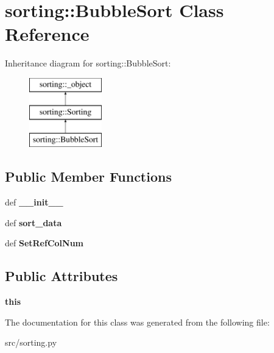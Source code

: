 \hypertarget{classsorting_1_1BubbleSort}{
\section{sorting::BubbleSort Class Reference}
\label{d2/df3/classsorting_1_1BubbleSort}
}
Inheritance diagram for sorting::BubbleSort:\begin{figure}[H]
\begin{center}
\leavevmode
\includegraphics[height=3cm]{d2/df3/classsorting_1_1BubbleSort}
\end{center}
\end{figure}
\subsection*{Public Member Functions}
\begin{DoxyCompactItemize}
\item 
\hypertarget{classsorting_1_1BubbleSort_a085714342ebc22e2621a9c2764b4fffc}{
def {\bfseries \_\-\_\-init\_\-\_\-}}
\label{d2/df3/classsorting_1_1BubbleSort_a085714342ebc22e2621a9c2764b4fffc}

\item 
\hypertarget{classsorting_1_1BubbleSort_a5ecb956b8a3c882303b00f0fca833f8e}{
def {\bfseries sort\_\-data}}
\label{d2/df3/classsorting_1_1BubbleSort_a5ecb956b8a3c882303b00f0fca833f8e}

\item 
\hypertarget{classsorting_1_1BubbleSort_ae2a1b854b9d4be168e5c16853e1158b6}{
def {\bfseries SetRefColNum}}
\label{d2/df3/classsorting_1_1BubbleSort_ae2a1b854b9d4be168e5c16853e1158b6}

\end{DoxyCompactItemize}
\subsection*{Public Attributes}
\begin{DoxyCompactItemize}
\item 
\hypertarget{classsorting_1_1BubbleSort_aad1e6f3f63d7717a890f426cc024d42d}{
{\bfseries this}}
\label{d2/df3/classsorting_1_1BubbleSort_aad1e6f3f63d7717a890f426cc024d42d}

\end{DoxyCompactItemize}


The documentation for this class was generated from the following file:\begin{DoxyCompactItemize}
\item 
src/sorting.py\end{DoxyCompactItemize}
